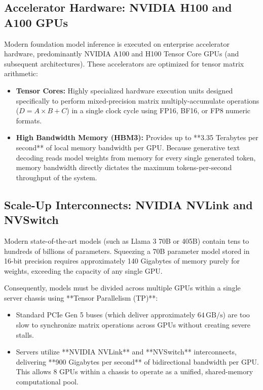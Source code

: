 \documentclass[12pt,a4paper]{report}
\begin{document}
\subsection{Accelerator Hardware: NVIDIA H100 and A100 GPUs}
Modern foundation model inference is executed on enterprise accelerator hardware, predominantly NVIDIA A100 and H100 Tensor Core GPUs (and subsequent architectures). These accelerators are optimized for tensor matrix arithmetic:
\begin{itemize}[leftmargin=1.2cm]
    \item \textbf{Tensor Cores:} Highly specialized hardware execution units designed specifically to perform mixed-precision matrix multiply-accumulate operations ($D = A \times B + C$) in a single clock cycle using FP16, BF16, or FP8 numeric formats.
    \item \textbf{High Bandwidth Memory (HBM3):} Provides up to **3.35 Terabytes per second** of local memory bandwidth per GPU. Because generative text decoding reads model weights from memory for every single generated token, memory bandwidth directly dictates the maximum tokens-per-second throughput of the system.
\end{itemize}

\subsection{Scale-Up Interconnects: NVIDIA NVLink and NVSwitch}
Modern state-of-the-art models (such as Llama 3 70B or 405B) contain tens to hundreds of billions of parameters. Squeezing a 70B parameter model stored in 16-bit precision requires approximately 140 Gigabytes of memory purely for weights, exceeding the capacity of any single GPU.

Consequently, models must be divided across multiple GPUs within a single server chassis using **Tensor Parallelism (TP)**:
\begin{itemize}[leftmargin=1.2cm]
    \item Standard PCIe Gen 5 buses (which deliver approximately $64\,\text{GB/s}$) are too slow to synchronize matrix operations across GPUs without creating severe stalls.
    \item Servers utilize **NVIDIA NVLink** and **NVSwitch** interconnects, delivering **900 Gigabytes per second** of bidirectional bandwidth per GPU. This allows 8 GPUs within a chassis to operate as a unified, shared-memory computational pool.
\end{itemize}
\end{document}
